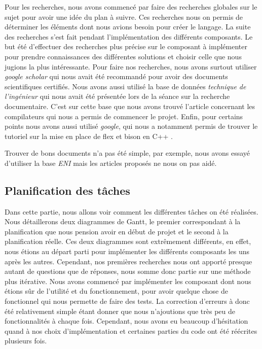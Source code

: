 \documentclass[a4paper]{article}%
\begin{document}
Pour les recherches, nous avons commencé par faire des recherches globales sur le
sujet pour avoir une idée du plan à suivre. Ces recherches nous on permis de
déterminer les éléments dont nous avions besoin pour créer le langage. La suite
des recherches s'est fait pendant l'implémentation des différents composants. Le
but été d'effectuer des recherches plus précise sur le composant à implémenter
pour prendre connaissances des différentes solutions et choisir celle que nous
jugions la plus intéressante. Pour faire nos recherches, nous avons surtout
utiliser \textit{google scholar} qui nous avait été recommandé pour avoir des
documents scientifiques certifiés. Nous avons aussi utilisé la base de données
\textit{technique de l'ingénieur} qui nous avait été présentée lors de la séance
sur la recherche documentaire. C'est sur cette base que nous avons trouvé
l'article concernant les compilateurs \cite{compilerTICH} qui nous a permis de
commencer le projet. Enfin, pour certains points nous avons aussi utilisé
\textit{google}, qui nous a notamment permis de trouver le tutoriel sur la mise
en place de flex et bison en C++ \cite{cppparsing}.

Trouver de bons documents n'a pas été simple, par exemple, nous avons essayé
d'utiliser la base \textit{ENI} mais les articles proposés ne nous on pas aidé.

\clearpage
\subsection{Planification des tâches}

Dans cette partie, nous allons voir comment les différentes tâches on été
réalisées. Nous détaillerons deux diagrammes de Gantt, le premier correspondant
à la planification que nous pension avoir en début de projet et le second à la
planification réelle. Ces deux diagrammes sont extrêmement différents, en effet,
nous étions au départ parti pour implémenter les différents composants les uns
après les autres. Cependant, nos premières recherches nous ont apporté presque
autant de questions que de réponses, nous somme donc partie sur une méthode plus
itérative. Nous avons commencé par implémenter les composant dont nous étions
sûr de l'utilité et du fonctionnement, pour avoir quelque chose de fonctionnel
qui nous permette de faire des tests. La correction d'erreurs à donc été
relativement simple étant donner que nous n'ajoutions que très peu de
fonctionnalités à chaque fois. Cependant, nous avons eu beaucoup d'hésitation
quand à nos choix d'implémentation et certaines parties du code ont été
réécrites plusieurs fois.\\
\end{document}
